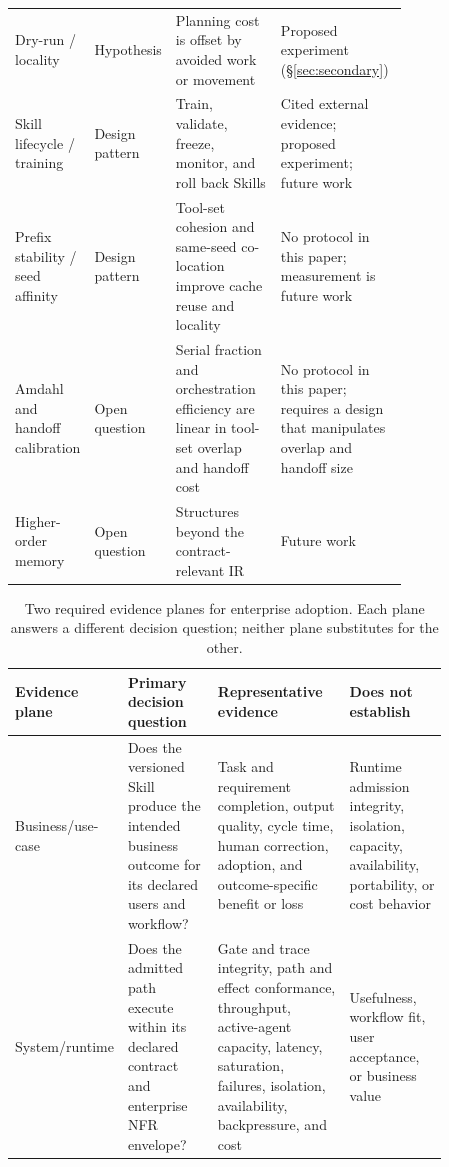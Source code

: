 \documentclass[11pt]{article}
\begin{document}
\begin{table}[t]
\begin{tabular}{lp{0.14\linewidth}p{0.30\linewidth}p{0.34\linewidth}}
Dry-run / locality & Hypothesis & Planning cost is offset by avoided work or movement & Proposed experiment (\S\ref{sec:secondary}) \\
Skill lifecycle / training & Design pattern & Train, validate, freeze, monitor, and roll back Skills & Cited external evidence; proposed experiment; future work \\
Prefix stability / seed affinity & Design pattern & Tool-set cohesion and same-seed co-location improve cache reuse and locality & No protocol in this paper; measurement is future work \\
Amdahl and handoff calibration & Open question & Serial fraction and orchestration efficiency are linear in tool-set overlap and handoff cost & No protocol in this paper; requires a design that manipulates overlap and handoff size \\
Higher-order memory & Open question & Structures beyond the contract-relevant IR & Future work \\
\hline
\end{tabular}
\end{table}

\begin{table}[t]
\centering
\caption{Two required evidence planes for enterprise adoption. Each plane answers a different decision question; neither plane substitutes for the other.}
\label{tab:evidence-planes}
\begin{tabular}{lp{0.25\linewidth}p{0.34\linewidth}p{0.27\linewidth}}
\hline
Evidence plane & Primary decision question & Representative evidence & Does not establish \\
\hline
Business/use-case & Does the versioned Skill produce the intended business outcome for its declared users and workflow? & Task and requirement completion, output quality, cycle time, human correction, adoption, and outcome-specific benefit or loss & Runtime admission integrity, isolation, capacity, availability, portability, or cost behavior \\
System/runtime & Does the admitted path execute within its declared contract and enterprise NFR envelope? & Gate and trace integrity, path and effect conformance, throughput, active-agent capacity, latency, saturation, failures, isolation, availability, backpressure, and cost & Usefulness, workflow fit, user acceptance, or business value \\
\hline
\end{tabular}
\end{table}
\end{document}
